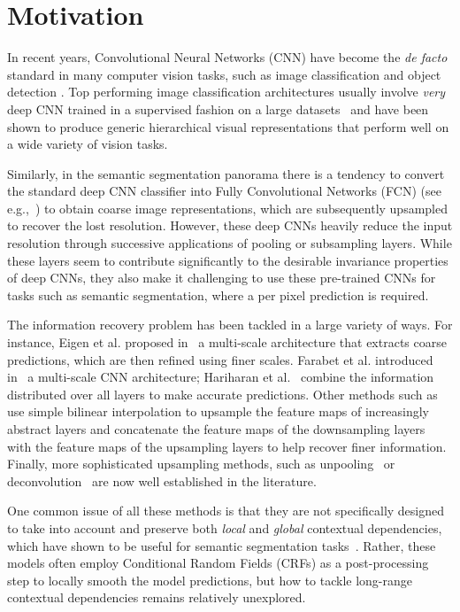 \section{Motivation}\label{sec:reseg_rationale}

In recent years, Convolutional Neural Networks (CNN) have become the {\em de
facto} standard in many computer vision tasks, such as image classification and
object detection \cite{Krizhevsky-2012,Erhan2014}. Top performing image
classification architectures usually involve {\em very} deep CNN trained in a
supervised fashion on a large datasets~\cite{Lin2014,Simonyan2015,
szegedy2014going} and have been shown to produce generic hierarchical visual
representations that perform well on a wide variety of vision tasks.

Similarly, in the semantic segmentation panorama there is a tendency to convert
the standard deep CNN classifier into Fully Convolutional Networks (FCN) (see
e.g.,~\cite{long2014fully,noh2015learning, badrinarayanan2015segnet,
Ronneberger2015}) to obtain coarse image representations, which are
subsequently upsampled to recover the lost resolution. However, these deep CNNs
heavily reduce the input resolution through successive applications of pooling
or subsampling layers. While these layers seem to contribute significantly to
the desirable invariance properties of deep CNNs, they also make it challenging
to use these pre-trained CNNs for tasks such as semantic segmentation, where a
per pixel prediction is required.

The information recovery problem has been tackled in a large variety of ways.
For instance, Eigen et al. proposed in~\cite{Eigen2015} a multi-scale
architecture that extracts coarse predictions, which are then refined using
finer scales. Farabet et al. introduced in~\cite{Farabet:2013} a multi-scale
CNN architecture; Hariharan et al.~\cite{Hariharan2015} combine the information
distributed over all layers to make accurate predictions. Other methods such
as~\cite{long2014fully,badrinarayanan2015segnet} use simple bilinear
interpolation to upsample the feature maps of increasingly abstract layers and
\cite{Ronneberger2015} concatenate the feature maps of the downsampling layers
with the feature maps of the upsampling layers to help recover finer
information. Finally, more sophisticated upsampling methods, such as
unpooling~\cite{noh2015learning,badrinarayanan2015segnet} or
deconvolution~\cite{long2014fully} are now well established in the literature.

One common issue of all these methods is that they are not specifically
designed to take into account and preserve both \emph{local} and \emph{global}
contextual dependencies, which have shown to be useful for semantic
segmentation tasks~\cite{Singh2013,Gatta14-deepvision}. Rather, these models
often employ Conditional Random Fields (CRFs) as a post-processing step to
locally smooth the model predictions, but how to tackle long-range contextual
dependencies remains relatively unexplored.

